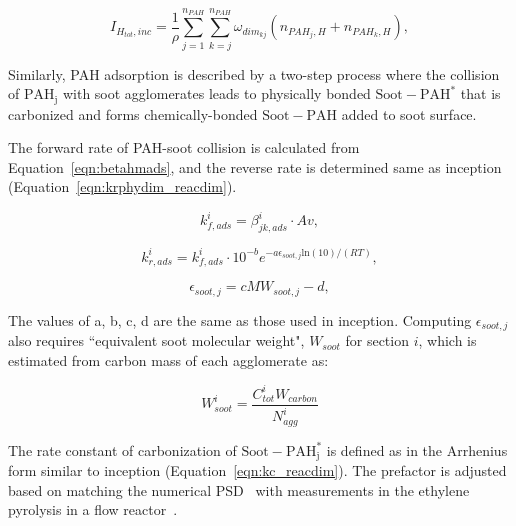 \begin{equation}
	I_{H_{tot},{inc}} = 
	\frac{1}{\rho}
	\sum_{j=1}^{n_{PAH}} \sum_{k=j}^{n_{PAH}}  \omega_{dim_{kj}} 
	\left(
	n_{PAH_j,H}+n_{PAH_k,H}
	\right)
	\label{eqn:IHtot_inc},
\end{equation}

Similarly, PAH adsorption is described by a two-step process where the collision of $\mathrm{PAH_j}$ with soot agglomerates leads to physically bonded $\mathrm{Soot-PAH^*}$ that is carbonized and forms chemically-bonded $\mathrm{Soot-PAH}$ added to soot surface.



The forward rate of PAH-soot collision is calculated from Equation~\eqref{eqn:betahmads}, and the reverse rate is determined same as inception (Equation~\eqref{eqn:krphydim_reacdim}).

\begin{equation}
	k^i_{f,ads}=\beta^i_{jk,ads}\cdot Av
	\label{eqn:kfads_reacdim},
\end{equation}

\begin{equation}
	k^i_{r,ads}=k^i_{f,ads}\cdot10^{-b}e^{-a\epsilon_{soot,j} \mathrm{ln}(10)/(RT)}
	\label{eqn:krads_reacdim},
\end{equation}

\begin{equation}
	\epsilon_{soot,j} = cMW_{soot,j} -d
	\label{eqn:epsilonads_reacdim},
\end{equation}

The values of a, b, c, d are the same as those used in inception. Computing ${\epsilon_{soot,j}}$ also requires ``equivalent soot molecular weight", ${W_{soot}}$ for section $i$, which is estimated from carbon mass of each agglomerate as:

\begin{equation}
	W^i_{soot}=\frac{C^i_{tot}W_{carbon}}{N^i_{agg}} 
\end{equation}

The rate constant of carbonization of $\mathrm{Soot-PAH^*_j}$ is defined as in the Arrhenius form similar to inception (Equation~\eqref{eqn:kc_reacdim}). The prefactor is adjusted based on matching the numerical PSD~\citep{naseri2022simulating} with measurements in the ethylene pyrolysis in a flow reactor~\cite{araki2021effects}. 

